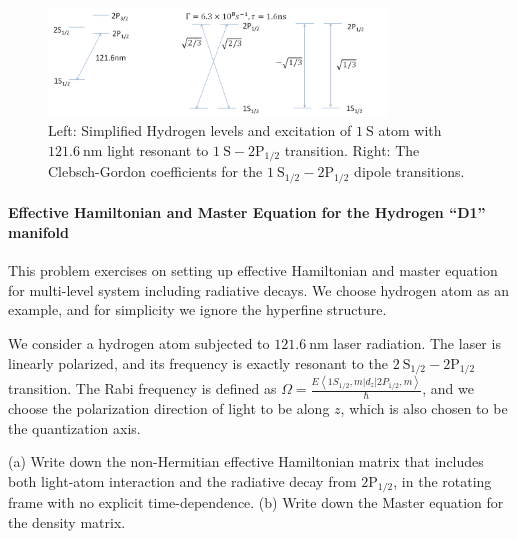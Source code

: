 \documentclass[hyperref, a4paper]{article}
\begin{document}
\begin{figure}
    \centering
    \includegraphics[width=0.8\textwidth]{fig4.png}
    \caption{Left: Simplified Hydrogen levels and excitation of $1 \mathrm{~S}$ atom with $121.6 \mathrm{~nm}$ light resonant to $1 \mathrm{~S}-2 \mathrm{P}_{1 / 2}$ transition. Right: The Clebsch-Gordon coefficients for the $1 \mathrm{~S}_{1 / 2}-2 \mathrm{P}_{1 / 2}$ dipole transitions.}
    \label{fig:sys-4}
\end{figure}

\paragraph{Effective Hamiltonian and Master Equation for the Hydrogen ``D1'' manifold} 
This problem exercises on setting up effective Hamiltonian and master equation for multi-level system including radiative decays. We choose hydrogen atom as an example, and for simplicity we ignore the hyperfine structure.

We consider a hydrogen atom subjected to $121.6 \mathrm{~nm}$ laser radiation. The laser is linearly polarized, and its frequency is exactly resonant to the $2 \mathrm{~S}_{1 / 2}-2 \mathrm{P}_{1 / 2}$ transition. The Rabi frequency is defined as $\Omega=\frac{E\left\langle 1 S_{1 / 2}, m\left|d_{z}\right| 2 P_{1 / 2}, m\right\rangle}{\hbar}$, and we choose the polarization direction of light to be along $z$, which is also chosen to be the quantization axis.

(a) Write down the non-Hermitian effective Hamiltonian matrix that includes both light-atom interaction and the radiative decay from $2 \mathrm{P}_{1 / 2}$, in the rotating frame with no explicit time-dependence.
(b) Write down the Master equation for the density matrix.
\end{document}
